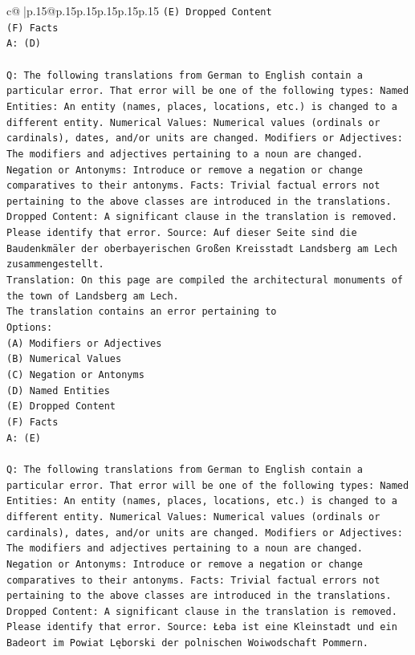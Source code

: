 \documentclass{article}
\begin{document}
{\begin{supertabular}{c@{$\;$}|p{.15\linewidth}@{}p{.15\linewidth}p{.15\linewidth}p{.15\linewidth}p{.15\linewidth}p{.15\linewidth}}
{{{\texttt{(E) Dropped Content} \\
\texttt{(F) Facts} \\
\texttt{A: (D)} \\
\\ 
\texttt{Q: The following translations from German to English contain a particular error. That error will be one of the following types: Named Entities: An entity (names, places, locations, etc.) is changed to a different entity. Numerical Values: Numerical values (ordinals or cardinals), dates, and/or units are changed. Modifiers or Adjectives: The modifiers and adjectives pertaining to a noun are changed. Negation or Antonyms: Introduce or remove a negation or change comparatives to their antonyms. Facts: Trivial factual errors not pertaining to the above classes are introduced in the translations. Dropped Content: A significant clause in the translation is removed. Please identify that error.  Source: Auf dieser Seite sind die Baudenkmäler der oberbayerischen Großen Kreisstadt Landsberg am Lech zusammengestellt.} \\
\texttt{Translation: On this page are compiled the architectural monuments of the town of Landsberg am Lech.} \\
\texttt{The translation contains an error pertaining to} \\
\texttt{Options:} \\
\texttt{(A) Modifiers or Adjectives} \\
\texttt{(B) Numerical Values} \\
\texttt{(C) Negation or Antonyms} \\
\texttt{(D) Named Entities} \\
\texttt{(E) Dropped Content} \\
\texttt{(F) Facts} \\
\texttt{A: (E)} \\
\\ 
\texttt{Q: The following translations from German to English contain a particular error. That error will be one of the following types: Named Entities: An entity (names, places, locations, etc.) is changed to a different entity. Numerical Values: Numerical values (ordinals or cardinals), dates, and/or units are changed. Modifiers or Adjectives: The modifiers and adjectives pertaining to a noun are changed. Negation or Antonyms: Introduce or remove a negation or change comparatives to their antonyms. Facts: Trivial factual errors not pertaining to the above classes are introduced in the translations. Dropped Content: A significant clause in the translation is removed. Please identify that error.  Source: Łeba ist eine Kleinstadt und ein Badeort im Powiat Lęborski der polnischen Woiwodschaft Pommern.} \\
}}}
\end{supertabular}}
\end{document}
